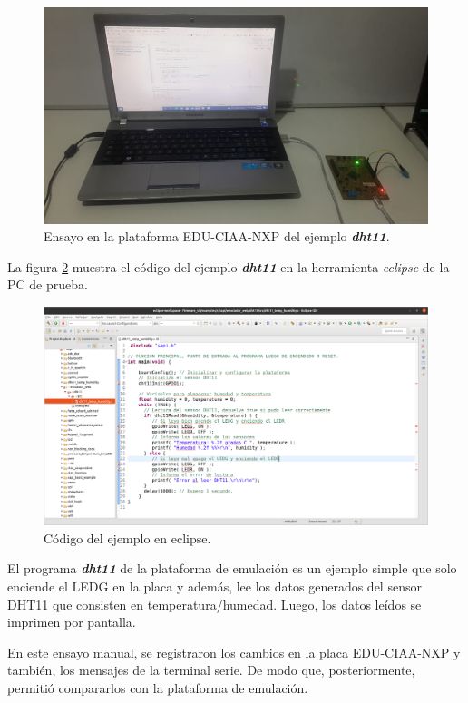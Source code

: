 \begin{figure}[ht]
	\centering
	\includegraphics[scale=.45]{./Figures/TestHardware.jpeg}
	\caption{Ensayo en la plataforma EDU-CIAA-NXP del ejemplo \textit{\textbf{dht11}}.}
	\label{fig:TestHardware}
\end{figure}

La figura \ref{fig:TestEclipse} muestra el código del ejemplo \textit{\textbf{dht11}} en la herramienta \textit{eclipse} de la PC de prueba.

\begin{figure}[ht]
	\centering
	\includegraphics[scale=.20]{./Figures/TestEclipse.png}
	\caption{Código del ejemplo en eclipse.}
	\label{fig:TestEclipse}
\end{figure}

El programa \textit{\textbf{dht11}} de la plataforma de emulación es un ejemplo simple que solo enciende el LEDG en la placa y además, lee los datos generados del sensor DHT11 que consisten en temperatura/humedad. Luego, los datos leídos se imprimen por pantalla. 

En este ensayo manual, se registraron los cambios en la placa EDU-CIAA-NXP y también, los mensajes de la terminal serie. De modo que, posteriormente, permitió compararlos con la plataforma de emulación.

